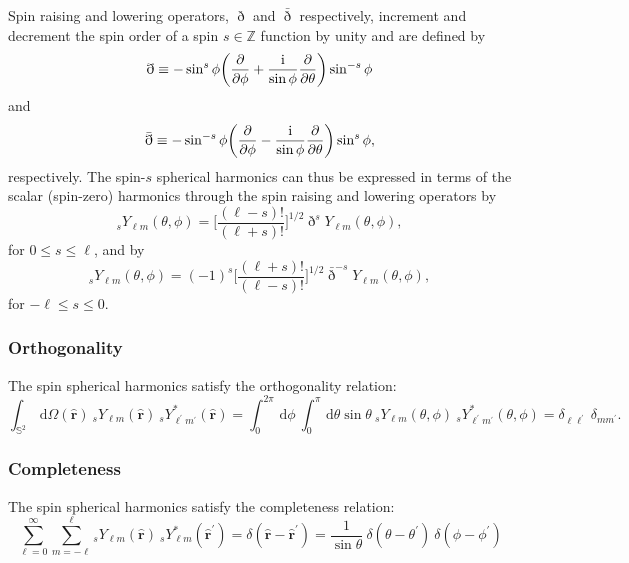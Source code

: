 \documentclass[a4paper,11pt]{article}
\newcommand{\integers}{\ensuremath{{\mathbb{Z}}}}
\newcommand{\sphere}{\ensuremath{{\mathbb{S}^2}}}
\newcommand{\dx}{\ensuremath{\mathrm{\,d}}}
\newcommand{\im}{{\rm i}}
\newcommand{\rang}{{\boldsymbol{\hat{r}}}}
\newcommand{\spinup}{\ensuremath{\eth}}
\newcommand{\spindown}{\ensuremath{\bar{\eth}}}
\begin{document}
Spin raising and lowering operators, $\spinup$ and $\spindown$ respectively, increment and decrement the spin order of a spin $s \in \integers$ function by unity and are defined by
\begin{equation}  
  \spinup \equiv
  -\sin^s \phi 
  \biggl ( 
  \frac{\partial}{\partial \phi} 
  + \frac{\im}{\sin\phi} \frac{\partial}{\partial \theta}
  \biggr)
  \sin^{-s}\phi
\end{equation}
and
\begin{equation}  
  \spindown \equiv 
  -\sin^{-s} \phi 
  \biggl ( 
  \frac{\partial}{\partial \phi} 
  - \frac{\im}{\sin\phi} \frac{\partial}{\partial \theta}
  \biggr)
  \sin^{s}\phi
  ,
\end{equation}
respectively.  
%
The spin-$s$ spherical harmonics can thus be expressed in terms of
the scalar (spin-zero) harmonics through the spin raising and lowering
operators by 
\begin{equation}    
  {}_s Y_{\ell m}(\theta,\phi)
  =
  \biggl[ \frac{(\ell-s)!}{(\ell+s)!} \biggr]^{1/2} 
  \spinup^s
  Y_{\ell m}(\theta,\phi)
  ,
\end{equation}
for $0 \leq s \leq \ell$,
and by 
\begin{equation}    
  {}_s Y_{\ell m}(\theta,\phi)
  =
  (-1)^s
  \biggl[ \frac{(\ell+s)!}{(\ell-s)!} \biggr]^{1/2} 
  \spindown^{-s}
  Y_{\ell m}(\theta,\phi)  
  ,
\end{equation}
for $-\ell \leq s \leq 0$.



\subsubsection{Orthogonality}

The spin spherical harmonics satisfy the orthogonality relation:
\begin{equation}
  \int_\sphere \dx \Omega(\rang) \:
  {}_s Y_{\ell m}(\rang) \:
  {}_s Y_{\ell^\prime m^\prime}^\ast(\rang) 
  = 
  \int_0^{2\pi} \dx \phi \:
  \int_0^{\pi} \dx \theta \sin\theta \:
  {}_s Y_{\ell m}(\theta, \phi) \:
  {}_s Y_{\ell^\prime m^\prime}^\ast(\theta, \phi) 
  = 
  \delta_{\ell \ell^\prime} \:
  \delta_{m m^\prime}
  .
\end{equation}

\subsubsection{Completeness}

The spin spherical harmonics satisfy the completeness relation:
\begin{equation}
  \sum_{\ell=0}^\infty \sum_{m=-\ell}^{\ell}
  {}_s Y_{\ell m}(\rang) \:
  {}_s Y_{\ell m}^\ast(\rang^\prime) 
  = 
  \delta(\rang-\rang^\prime)
  = 
  \frac{1}{\sin\theta} \:
  \delta(\theta-\theta^\prime) \:
  \delta(\phi-\phi^\prime)
\end{equation}
\end{document}
